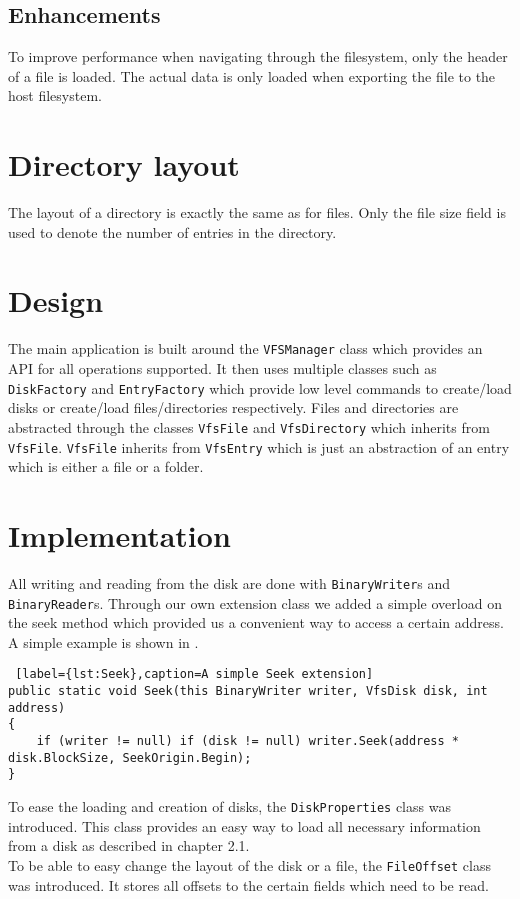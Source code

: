 \documentclass{report}
\begin{document}
\subsection{Enhancements}
To improve performance when navigating through the filesystem, only the header of a file is loaded. The actual data is only loaded when exporting the file to the host filesystem.

\section{Directory layout}
The layout of a directory is exactly the same as for files. Only the file size field is used to denote the number of entries in the directory.

\section{Design}
The main application is built around the \texttt{VFSManager} class which provides an API for all operations supported. It then uses multiple classes such as \texttt{DiskFactory} and \texttt{EntryFactory} which provide low level commands to create/load disks or create/load files/directories respectively. Files and directories are abstracted through the classes \texttt{VfsFile} and \texttt{VfsDirectory} which inherits from \texttt{VfsFile}. \texttt{VfsFile} inherits from \texttt{VfsEntry} which is just an abstraction of an entry which is either a file or a folder.

\section{Implementation}
All writing and reading from the disk are done with \texttt{BinaryWriter}s and \texttt{BinaryReader}s. Through our own extension class we added a simple overload on the seek method which provided us a convenient way to access a certain address. A simple example is shown in .\\
\begin{lstlisting} [label={lst:Seek},caption=A simple Seek extension]
public static void Seek(this BinaryWriter writer, VfsDisk disk, int address)
{
    if (writer != null) if (disk != null) writer.Seek(address * disk.BlockSize, SeekOrigin.Begin);
}
\end{lstlisting}
To ease the loading and creation of disks, the \texttt{DiskProperties} class was introduced. This class provides an easy way to load all necessary information from a disk as described in chapter 2.1. \\To be able to easy change the layout of the disk or a file, the \texttt{FileOffset} class was introduced. It stores all offsets to the certain fields which need to be read. 
\end{document}
